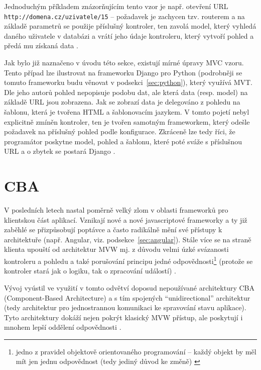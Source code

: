     Jednoduchým příkladem znázorňujícím tento vzor je např. otevření URL \verb|http://domena.cz/uzivatele/15| -- požadavek je zachycen tzv. routerem a na základě parametrů se použije příslušný kontroler, ten zavolá model, který vyhledá daného uživatele v databázi a vrátí jeho údaje kontroleru, který vytvoří pohled a předá mu získaná data \cite{mvc-cz1}.
    
    Jak bylo již naznačeno v úvodu této sekce, existují mírné úpravy MVC vzoru. Tento případ lze ilustrovat na frameworku Django pro Python (podrobněji se tomuto frameworku budu věnovat v podsekci~\ref{sec:python}), který využívá MVT. Dle jeho autorů \cite{django-docs-mvp} pohled nepopisuje podobu dat, ale která data (resp. model) na základě URL jsou zobrazena. Jak se zobrazí data je delegováno z pohledu na šablonu, která je tvořena HTML a šablonovacím jazykem. V tomto pojetí nebyl explicitně zmíněn kontroler, ten je tvořen samotným frameworkem, který odešle požadavek na příslušný pohled podle konfigurace. Zkráceně lze tedy říci, že programátor poskytne model, pohled a šablonu, které poté sváže s příslušnou URL a o zbytek se postará Django \cite{django-mvp2}.
    
    \section{CBA}\label{cba}
    V posledních letech nastal poměrně velký zlom v oblasti frameworků pro klientskou část aplikací. Vznikají nové a nové javascriptové frameworky a ty již zaběhlé se přizpůsobují poptávce a často radikálně mění své přístupy k architektuře (např. Angular, viz. podsekce~\ref{sec:angular}). Stále více se na straně klienta upouští od architektur MVW mj. z důvodu velmi úzké svázanosti kontroleru a pohledu a také porušování principu jedné odpovědnosti\footnote{jedno z pravidel objektově orientovaného programování -- každý objekt by měl mít jen jednu odpovědnost (tedy jediný důvod ke změně) \cite{single-responsibility}} (protože se kontroler stará jak o logiku, tak o zpracování událostí) \cite{mvc-frontend}.
    
    Vývoj vyústil ve využití v tomto odvětví doposud nepoužívané architektury CBA (Component-Based Architecture) a s tím spojených  \enquote{unidirectional} architektur (tedy architektur pro jednostrannou komunikaci ke spravování stavu aplikace). Tyto architektury dokáží nejen pokrýt klasický MVW přístup, ale poskytují i mnohem lepší oddělení odpovědnosti \cite{mvc-frontend}.
    
